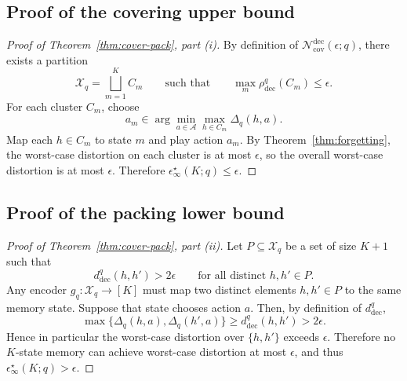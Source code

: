 \documentclass{article}
\theoremstyle{plain}
\theoremstyle{definition}
\theoremstyle{remark}
\newcommand{\cA}{\mathcal{A}}
\newcommand{\cX}{\mathcal{X}}
\newcommand{\cN}{\mathcal{N}}
\newcommand{\eps}{\epsilon}
\begin{document}
\subsection{Proof of the covering upper bound}
\label{app:proof-covering}
\begin{proof}[Proof of Theorem~\ref{thm:cover-pack}, part (i)]
By definition of \(\cN^{\mathrm{dec}}_{\mathrm{cov}}(\eps;q)\), there exists
a partition
\[
\cX_q=\bigsqcup_{m=1}^{K} C_m
\qquad\text{such that}\qquad
\max_m \rho_{\mathrm{dec}}^q(C_m)\le \eps.
\]
For each cluster \(C_m\), choose
\[
a_m\in\arg\min_{a\in\cA}\max_{h\in C_m}\Delta_q(h,a).
\]
Map each \(h\in C_m\) to state \(m\) and play action \(a_m\).
By Theorem~\ref{thm:forgetting}, the worst-case distortion on each cluster
is at most \(\eps\), so the overall worst-case distortion is at most \(\eps\).
Therefore \(\eps^\star_\infty(K;q)\le \eps\).
\end{proof}
\subsection{Proof of the packing lower bound}
\label{app:proof-packing}
\begin{proof}[Proof of Theorem~\ref{thm:cover-pack}, part (ii)]
Let \(P\subseteq\cX_q\) be a set of size \(K+1\) such that
\[
d_{\mathrm{dec}}^q(h,h')>2\eps
\qquad
\text{for all distinct } h,h'\in P.
\]
Any encoder \(g_q:\cX_q\to[K]\) must map two distinct elements
\(h,h'\in P\) to the same memory state. Suppose that state chooses action
\(a\). Then, by definition of \(d_{\mathrm{dec}}^q\),
\[
\max\{\Delta_q(h,a),\Delta_q(h',a)\}
\ge d_{\mathrm{dec}}^q(h,h')
>2\eps.
\]
Hence in particular the worst-case distortion over \(\{h,h'\}\) exceeds
\(\eps\). Therefore no \(K\)-state memory can achieve worst-case distortion
at most \(\eps\), and thus \(\eps^\star_\infty(K;q)>\eps\).
\end{proof}
\end{document}
